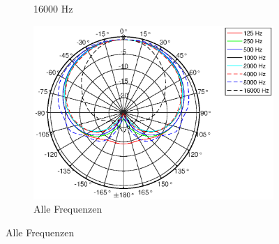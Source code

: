 \begin{figure}[b]
\begin{subfigure}{.33\textwidth}
        \caption{16000 Hz}
        \label{fig:Polar_16000}
    \end{subfigure}
    \begin{subfigure}{.33\textwidth}
        \centering
        \includegraphics[height=\linewidth]{Figures/KM184_allfreqs}
        \caption{Alle Frequenzen}
        \label{fig:Polar_allfreqs}
    \end{subfigure}
\end{figure}
